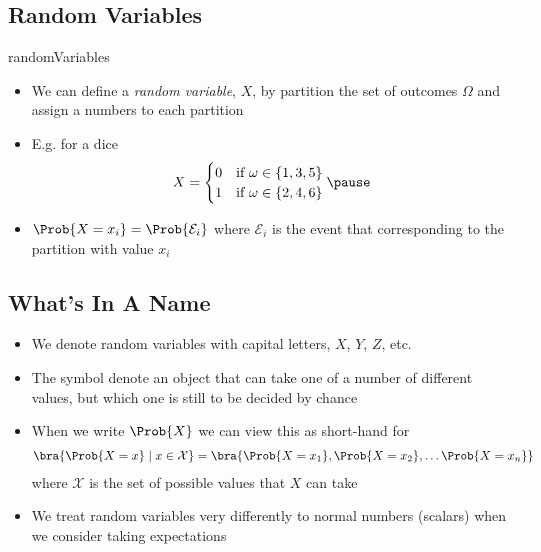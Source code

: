 \begin{slide}
\section{Random Variables}

\begin{PauseHighLight}
  \begin{rightImage}{randomVariables}
    \begin{itemize}
    \item We can define a \emph{random variable}, $X$, by partition the
      set of outcomes $\Omega$ and assign a numbers to each
      partition\pause
    \item E.g. for a dice
      \begin{align*}
        X =
        \begin{cases}
          0 & \text{if $\omega\in\{1,3,5\}$}\\
          1 & \text{if $\omega\in\{2,4,6\}$}
        \end{cases}\pause
      \end{align*}
    \item $\Prob{X=x_i} = \Prob{\mathcal{E}_i}$ where $\mathcal{E}_i$ is
      the event that corresponding to the partition with value
      $x_i$\pause
    \end{itemize}
  \end{rightImage}
\end{PauseHighLight}

\end{slide}


\begin{slide}
\section{What's In A Name}

\begin{PauseHighLight}
  \begin{itemize}
  \item We denote random variables with capital letters, $X$,
    $Y$, $Z$, etc.\pause
  \item The symbol denote an object that can take one of a number of
    different values, but which one is still to be decided by
    chance\pause
  \item When we write $\Prob{X}$ we can view this as short-hand for
    \begin{align*}
      \bra{\Prob{X=x} \mid x \in \mathcal{X}}
      = \bra{\Prob{X=x_1}, \Prob{X=x_2},\ldots\Prob{X=x_n}}
    \end{align*}
    where $\mathcal{X}$ is the set of possible values that $X$
    can take\pause
  \item We treat random variables very differently to normal numbers
    (scalars) when we consider taking expectations\pause
  \end{itemize}
\end{PauseHighLight}

\end{slide}


